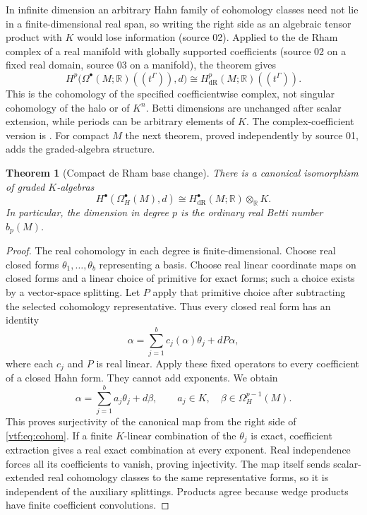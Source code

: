 \documentclass[11pt,letterpaper]{article}
\newtheorem{theorem}{Theorem}[section]
\theoremstyle{definition}
\theoremstyle{remark}
\newcommand{\R}{\mathbb R}\newcommand{\C}{\mathbb C}
\begin{document}
In infinite dimension an arbitrary Hahn family of cohomology classes need not
lie in a finite-dimensional real span, so writing the right side as an algebraic
tensor product with $K$ would lose information (source 02). Applied to the de
Rham complex of a real manifold with globally supported coefficients (source 02
on a fixed real domain, source 03 on a manifold), the theorem gives
\[
 H^p\bigl(\Omega^\bullet(M;\R)((t^\Gamma)),d\bigr)\cong
 H^p_{\mathrm{dR}}(M;\R)((t^\Gamma)).
\]
This is the cohomology of the specified coefficientwise complex, not singular
cohomology of the halo or of $K^n$. Betti dimensions are unchanged after scalar
extension, while periods can be arbitrary elements of $K$. The complex-coefficient
version is . For compact $M$ the next theorem,
proved independently by source 01, adds the graded-algebra structure.

\begin{theorem}[Compact de Rham base change]\label{vtf:thm:derham}
There is a canonical isomorphism of graded $K$-algebras
\begin{equation}\label{vtf:eq:cohom}
 H^\bullet(\Omega_H^\bullet(M),d)
 \cong H^\bullet_{\mathrm{dR}}(M;\R)\otimes_\R K.
\end{equation}
In particular, the dimension in degree $p$ is the ordinary real Betti number
$b_p(M)$.
\end{theorem}
\begin{proof}
The real cohomology in each degree is finite-dimensional. Choose real closed
forms $\theta_1,\ldots,\theta_b$ representing a basis. Choose real linear
coordinate maps on closed forms and a linear choice of primitive for exact
forms; such a choice exists by a vector-space splitting. Let $P$ apply that
primitive choice after subtracting the selected cohomology representative.
Thus every closed
real form has an identity
\[
 \alpha=\sum_{j=1}^b c_j(\alpha)\theta_j+dP\alpha,
\]
where each $c_j$ and $P$ is real linear. Apply these fixed operators to every
coefficient of a closed Hahn form. They cannot add exponents. We obtain
\[
 \alpha=\sum_{j=1}^b a_j\theta_j+d\beta,
 \qquad a_j\in K,\quad\beta\in\Omega_H^{p-1}(M).
\]
This proves surjectivity of the canonical map from the right side of
\eqref{vtf:eq:cohom}. If a finite $K$-linear combination of the $\theta_j$ is
exact, coefficient extraction gives a real exact combination at every
exponent. Real independence forces all its coefficients to vanish, proving
injectivity. The map itself sends scalar-extended real cohomology classes to
the same representative forms, so it is independent of the auxiliary
splittings. Products agree because wedge products have finite coefficient
convolutions.
\end{proof}
\end{document}
